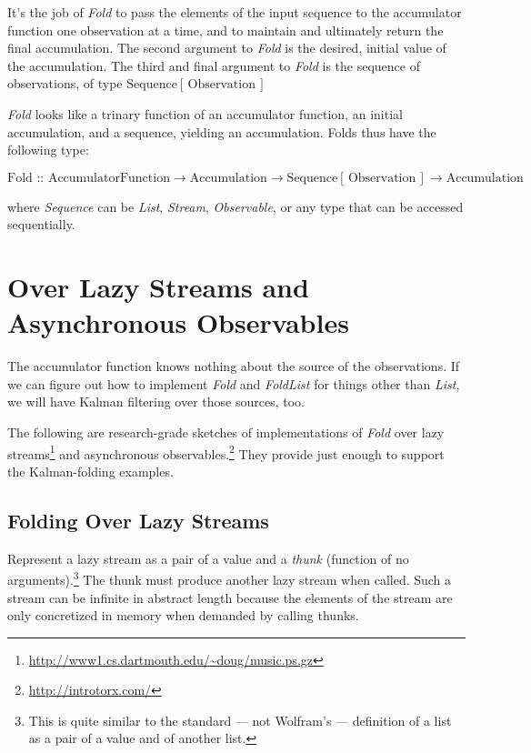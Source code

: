 \documentclass[10pt,oneside,x11names]{article}
\begin{document}
It's the job of \emph{Fold} to pass the elements of the input sequence to the
accumulator function one observation at a time, and to maintain and ultimately
return the final accumulation. The second argument to \emph{Fold} is
the desired, initial value of the accumulation. The
third and final argument to \emph{Fold} is the sequence of observations, of type
\(\text{Sequence}\left[\,\text{Observation}\,\right]\)

\emph{Fold} looks like a trinary function of an accumulator function, an
initial accumulation, and a sequence, yielding an accumulation. Folds thus have
the following type:

\begin{equation*}
\text{Fold :: }
\text{AccumulatorFunction}
\rightarrow
\text{Accumulation}
\rightarrow
\text{Sequence}\left[\,\text{Observation}\,\right]
\rightarrow
\text{Accumulation}
\end{equation*}

\noindent where \emph{Sequence} can be \emph{List}, \emph{Stream}, \emph{Observable}, or any type
that can be accessed sequentially. 

\section{Over Lazy Streams and Asynchronous Observables}
\label{sec:orgheadline16}

The accumulator function knows nothing about the source of the observations. If
we can figure out how to implement \emph{Fold} and \emph{FoldList} for things other than
\emph{List}, we will have Kalman filtering over those sources, too.

The following are research-grade sketches of implementations of \emph{Fold} over lazy
streams\footnote{\url{http://www1.cs.dartmouth.edu/~doug/music.ps.gz}} and asynchronous observables.\footnote{\url{http://introtorx.com/}} They provide just enough
to support the Kalman-folding examples.

\subsection{Folding Over Lazy Streams}
\label{sec:orgheadline9}

Represent a lazy stream as a pair of a value and a \emph{thunk} (function of
no arguments).\footnote{This is quite similar to the standard --- not  Wolfram's --- definition of a list as a pair of a value and of another list.} The thunk must produce another lazy stream when called. Such
a stream can be infinite in abstract length because the elements of the stream are only
concretized in memory when demanded by calling thunks.
\end{document}
